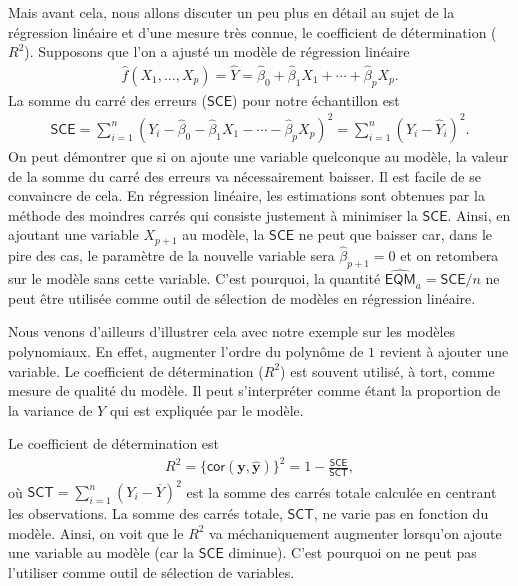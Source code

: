 \documentclass[
  11pt,
  letterpaper,
]{book}
\theoremstyle{definition}
\theoremstyle{definition}
\theoremstyle{definition}
\theoremstyle{remark}
\begin{document}
Mais avant cela, nous allons discuter un peu plus en détail au sujet de la régression linéaire et d'une mesure très connue, le coefficient de détermination (\(R^2\)). Supposons que l'on a ajusté un modèle de régression linéaire
\begin{align*}
\widehat{f}(X_1, \ldots, X_p) = \widehat{Y}=\widehat{\beta}_0 + \widehat{\beta}_1X_1+ \cdots + \widehat{\beta}_p X_p.
\end{align*}
La somme du carré des erreurs (\(\mathsf{SCE}\)) pour notre échantillon est
\begin{align*}
\mathsf{SCE}=\sum_{i=1}^n (Y_i - \widehat{\beta}_0 - \widehat{\beta}_1X_1 - \cdots - \widehat{\beta}_p X_p)^2 = \sum_{i=1}^n (Y_i-\widehat{Y}_i)^2.
 \end{align*}
On peut démontrer que si on ajoute une variable quelconque au modèle, la valeur de la somme du carré des erreurs va nécessairement baisser. Il est facile de se convaincre de cela. En régression linéaire, les estimations sont obtenues par la méthode des moindres carrés qui consiste justement à minimiser la \(\mathsf{SCE}\). Ainsi, en ajoutant une variable \(X_{p+1}\) au modèle, la \(\mathsf{SCE}\) ne peut que baisser car, dans le pire des cas, le paramètre de la nouvelle variable sera \(\widehat{\beta}_{p+1}=0\) et on retombera sur le modèle sans cette variable. C'est pourquoi, la quantité \(\widehat{\mathsf{EQM}}_a=\mathsf{SCE}/n\) ne peut être utilisée comme outil de sélection de modèles en régression linéaire.

Nous venons d'ailleurs d'illustrer cela avec notre exemple sur les modèles polynomiaux. En effet, augmenter l'ordre du polynôme de \(1\) revient à ajouter une variable. Le coefficient de détermination (\(R^2\)) est souvent utilisé, à tort, comme mesure de qualité du modèle. Il peut s'interpréter comme étant la proportion de la variance de \(Y\) qui est expliquée par le modèle.

Le coefficient de détermination est
\begin{align*}
R^2=\{\mathsf{cor}(\boldsymbol{y}, \widehat{\boldsymbol{y}})\}^2 = 1-\frac{\mathsf{SCE}}{\mathsf{SCT}},
\end{align*}
où \(\mathsf{SCT}=\sum_{i=1}^n (Y_i-\overline{Y})^2\) est la somme des carrés totale calculée en centrant les observations. La somme des carrés totale, \(\mathsf{SCT}\), ne varie pas en fonction du modèle.
Ainsi, on voit que le \(R^2\) va méchaniquement augmenter lorsqu'on ajoute une variable au modèle (car la \(\mathsf{SCE}\) diminue). C'est pourquoi on ne peut pas l'utiliser comme outil de sélection de variables.
\end{document}
